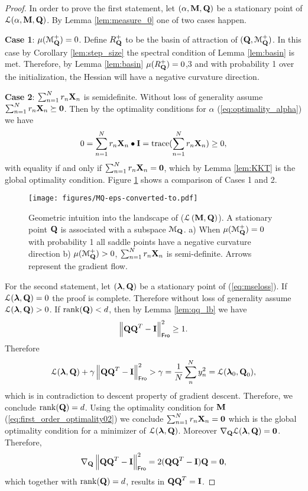 \documentclass[11pt]{article}
\theoremstyle{plain}
\DeclareMathOperator*{\rank}{rank}
\DeclareMathOperator*{\trace}{trace}
\DeclareMathOperator*{\lmq}{\ensuremath{\mathcal{L} \left(\Mx{M},\Mx{Q}\right) }}
\theoremstyle{plain}
\numberwithin{equation}{section}
\numberwithin{lemma}{section}
\numberwithin{theorem}{section}
\numberwithin{corollary}{section}
\numberwithin{observation}{section}
\numberwithin{definition}{section}
\numberwithin{example}{section}
\begin{document}
\begin{proof} 
In order to prove the first statement, let $(\alpha,\Mx{M},\Mx{Q})$ be a stationary point of $\mathcal{L}(\alpha,\Mx{M},\Mx{Q})$. By Lemma \ref{lem:measure_0} one of two cases happen.

\textbf{Case 1}: $\mu(\mathcal{M}^+_{\Mx{Q}}) = 0$. Define $R_{\Mx{Q}}^+$ to be the basin of attraction of $(\Mx{Q},\mathcal{M}^+_{\Mx{Q}})$. In this case by Corollary \ref{lem:step_size} the spectral condition of Lemma \ref{lem:basin} is met. Therefore, by Lemma \ref{lem:basin} $\mu(R_{\Mx{Q}}^+)=0$,3 and with probability 1 over the initialization, the Hessian will have a negative curvature direction.

\textbf{Case 2}: $\sum_{n=1}^N r_n \Mx{X}_n$ is semidefinite. Without loss of generality assume $\sum_{n=1}^N r_n \Mx{X}_n \succeq \Mx{0}$. Then by the optimality conditions for $\alpha$ (\ref{eq:optimality_alpha}) we have
\begin{align*}
    0 = \sum_{n=1}^N r_n \Mx{X}_n \bullet \Mx{I} = \trace(\sum_{n=1}^N r_n \Mx{X}_n) \geq 0,
\end{align*}
with equality if and only if $\sum_{n=1}^N r_n \Mx{X}_n = \Mx{0}$, which by Lemma \ref{lem:KKT} is the global optimality condition. Figure \ref{fig:MQ} shows a comparison of Cases 1 and 2.


\begin{figure}[H]
\begin{center}
\noindent
\texttt{[image: figures/MQ-eps-converted-to.pdf]}
\caption{Geometric intuition into the landscape of ($\lmq$). A stationary point $\Mx{Q}$ is associated with a subspace $\mathcal{M}_{\Mx{Q}}$. a) When $\mu(\mathcal{M}_{\Mx{Q}}^+)=0$ with probability 1 all saddle points have a negative curvature direction b) $\mu(\mathcal{M}_{\Mx{Q}}^+) > 0$, $\sum_{n=1}^N r_n \Mx{X}_n$ is semi-definite. Arrows represent the gradient flow.}
\label{fig:MQ}
\end{center}
\end{figure}

For the second statement, let $(\V{\lambda},\Mx{Q})$ be a stationary point of (\ref{eq:mseloss}). If $\mathcal{L}(\V{\lambda}, \Mx{Q}) = 0$ the proof is complete. Therefore without loss of generality assume $\mathcal{L}(\V{\lambda}, \Mx{Q}) > 0$. If $\rank(\Mx{Q}) < d $, then by Lemma \ref{lem:qq_lb} we have
\[
\left\|\Mx{QQ}^T - \Mx{I} \right\|_{\sf Fro}^2 \geq 1.
\]
Therefore
\[
\mathcal{L}(\V{\lambda},\Mx{Q}) + \gamma \left\|\Mx{QQ}^T-\Mx{I}\right\|^2_{\sf Fro} > \gamma = \frac{1}{N}\sum_{n}^N y_n^2 = \mathcal{L}(\V{\lambda}_0,\Mx{Q}_0),
\]
which is in contradiction to descent property of gradient descent. Therefore, we conclude $\rank(\Mx{Q}) = d$. Using the optimality condition for $\Mx{M}$ (\ref{eq:first_order_optimality02}) we conclude $\sum_{n=1}^N r_n \Mx{X}_n = \Mx{0}$ which is the global optimality condition for a minimizer of $\mathcal{L}(\V{\lambda},\Mx{Q})$. Moreover $\nabla_{\Mx{Q}} \mathcal{L}(\V{\lambda},\Mx{Q}) = \Mx{0}$. Therefore, 
\[\nabla_{\Mx{Q}} \left\|\Mx{QQ}^T - \Mx{I} \right\|_{\sf Fro}^2= 2(\Mx{QQ}^T-\Mx{I})\Mx{Q}=\Mx{0},
\]
which together with $\rank(\Mx{Q}) = d$, results in $\Mx{QQ}^T=\Mx{I}$.


\end{proof}
\end{document}
